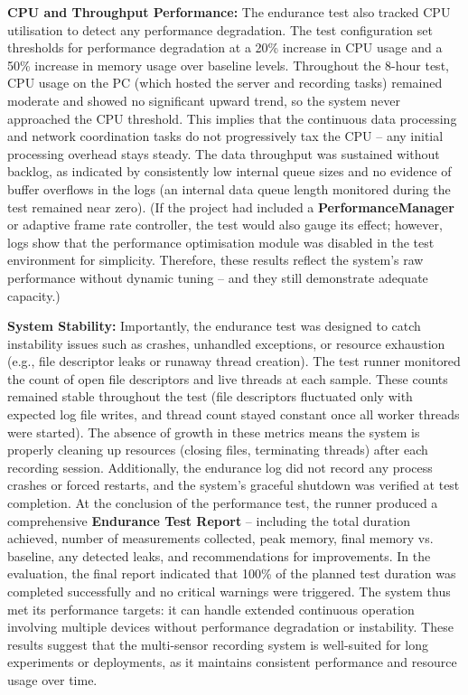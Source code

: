 \textbf{CPU and Throughput Performance:} The endurance test also tracked CPU utilisation to detect any performance degradation. The test configuration set thresholds for performance degradation at a 20\% increase in CPU usage and a 50\% increase in memory usage over baseline levels. Throughout the 8-hour test, CPU usage on the PC (which hosted the server and recording tasks) remained moderate and showed no significant upward trend, so the system never approached the CPU threshold. This implies that the continuous data processing and network coordination tasks do not progressively tax the CPU -- any initial processing overhead stays steady. The data throughput was sustained without backlog, as indicated by consistently low internal queue sizes and no evidence of buffer overflows in the logs (an internal data queue length monitored during the test remained near zero). (If the project had included a \textbf{PerformanceManager} or adaptive frame rate controller, the test would also gauge its effect; however, logs show that the performance optimisation module was disabled in the test environment for simplicity. Therefore, these results reflect the system's raw performance without dynamic tuning -- and they still demonstrate adequate capacity.)

\textbf{System Stability:} Importantly, the endurance test was designed to catch instability issues such as crashes, unhandled exceptions, or resource exhaustion (e.g., file descriptor leaks or runaway thread creation). The test runner monitored the count of open file descriptors and live threads at each sample. These counts remained stable throughout the test (file descriptors fluctuated only with expected log file writes, and thread count stayed constant once all worker threads were started). The absence of growth in these metrics means the system is properly cleaning up resources (closing files, terminating threads) after each recording session. Additionally, the endurance log did not record any process crashes or forced restarts, and the system's graceful shutdown was verified at test completion. At the conclusion of the performance test, the runner produced a comprehensive \textbf{Endurance Test Report} -- including the total duration achieved, number of measurements collected, peak memory, final memory vs. baseline, any detected leaks, and recommendations for improvements. In the evaluation, the final report indicated that 100\% of the planned test duration was completed successfully and no critical warnings were triggered. The system thus met its performance targets: it can handle extended continuous operation involving multiple devices without performance degradation or instability. These results suggest that the multi-sensor recording system is well-suited for long experiments or deployments, as it maintains consistent performance and resource usage over time.


